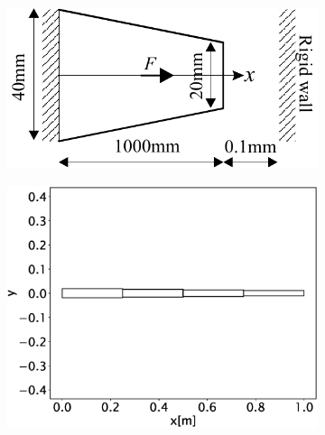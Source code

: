 \documentclass{article}
\begin{document}
\begin{figure}[ht]
    \centering
        \begin{subfigure}{0.49\textwidth}
            \includegraphics[width=1\linewidth]{figures/beam.pdf} 
            \caption{}
            \label{fig:beam}
        \end{subfigure}
        \begin{subfigure}{0.49\textwidth}
            \includegraphics[width=1\linewidth]{figures/tapered_beam.eps} 
            \caption{}
            \label{fig:tapered_beam}
        \end{subfigure}
        \begin{subfigure}{0.49\textwidth}

\end{subfigure}
\end{figure}
\end{document}
